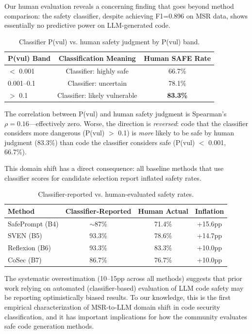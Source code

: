 \documentclass[10pt,conference]{IEEEtran}
\begin{document}
Our human evaluation reveals a concerning finding that goes beyond method comparison: the safety classifier, despite achieving F1=0.896 on MSR data, shows essentially no predictive power on LLM-generated code.

\begin{table}[h]
\centering
\caption{Classifier P(vul) vs. human safety judgment by P(vul) band.}
\label{tab:domain_shift}
\begin{tabular}{lcc}
\toprule
P(vul) Band & Classification Meaning & Human SAFE Rate \\
\midrule
$<$ 0.001 & Classifier: highly safe & 66.7\% \\
0.001--0.1 & Classifier: uncertain & 78.1\% \\
$>$ 0.1 & Classifier: likely vulnerable & \textbf{83.3\%} \\
\bottomrule
\end{tabular}
\end{table}

The correlation between P(vul) and human safety judgment is Spearman's $\rho=0.16$---effectively zero. Worse, the direction is \textit{reversed}: code that the classifier considers more dangerous (P(vul) $>$ 0.1) is \textit{more} likely to be safe by human judgment (83.3\%) than code the classifier considers safe (P(vul) $<$ 0.001, 66.7\%).

This domain shift has a direct consequence: all baseline methods that use classifier scores for candidate selection report inflated safety rates.

\begin{table}[h]
\centering
\caption{Classifier-reported vs. human-evaluated safety rates.}
\label{tab:inflation}
\begin{tabular}{lccc}
\toprule
Method & Classifier-Reported & Human Actual & Inflation \\
\midrule
SafePrompt (B4) & $\sim$87\% & 71.4\% & +15.6pp \\
SVEN (B5) & 93.3\% & 78.6\% & +14.7pp \\
Reflexion (B6) & 93.3\% & 83.3\% & +10.0pp \\
CoSec (B7) & 86.7\% & 76.7\% & +10.0pp \\
\bottomrule
\end{tabular}
\end{table}

The systematic overestimation (10--15pp across all methods) suggests that prior work relying on automated (classifier-based) evaluation of LLM code safety may be reporting optimistically biased results. To our knowledge, this is the first empirical characterization of MSR-to-LLM domain shift in code security classification, and it has important implications for how the community evaluates safe code generation methods.
\end{document}
